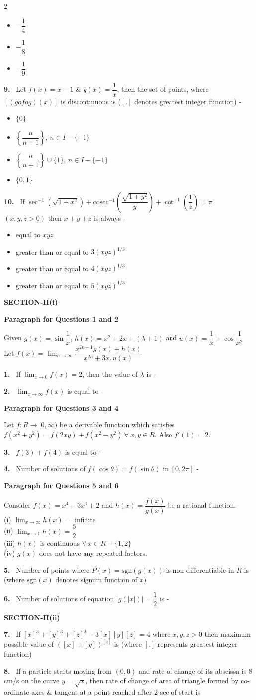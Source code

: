 \documentclass[10pt]{extarticle}
\newcommand{\sect}[1]{\par\smallskip\noindent\textbf{#1}\par}
\newcommand{\qn}[1]{\par\smallskip\noindent\textbf{#1.}~}
\newcommand{\paraq}[2]{\par\smallskip\noindent\textbf{Paragraph for Questions #1 and #2}\par}
\newenvironment{qoptions}{\begin{itemize}[leftmargin=1.8em,itemsep=1pt,topsep=2pt,label={}]}{\end{itemize}}
\newcommand{\opt}[2]{\item[(#1)] #2}
\begin{document}
\begin{multicols}{2}
\begin{qoptions}
\opt{B}{$-\dfrac14$}
\opt{C}{$-\dfrac18$}
\opt{D}{$-\dfrac19$}
\end{qoptions}
\qn{9} Let $f(x)=x-1$ \& $g(x)=\dfrac1x$, then the set of points, where $[(gofog)(x)]$ is discontinuous is ($[.]$ denotes greatest integer function) -
\begin{qoptions}
\opt{A}{$\{0\}$}
\opt{B}{$\left\{\dfrac{n}{n+1}\right\}$, $n\in I-\{-1\}$}
\opt{C}{$\left\{\dfrac{n}{n+1}\right\}\cup\{1\}$, $n\in I-\{-1\}$}
\opt{D}{$\{0,1\}$}
\end{qoptions}
\qn{10} If $\sec^{-1}\left(\sqrt{1+x^2}\right)+\mathrm{cosec}^{-1}\left(\dfrac{\sqrt{1+y^2}}{y}\right)+\cot^{-1}\left(\dfrac1z\right)=\pi$ $(x,y,z>0)$ then $x+y+z$ is always -
\begin{qoptions}
\opt{A}{equal to $xyz$}
\opt{B}{greater than or equal to $3(xyz)^{1/3}$}
\opt{C}{greater than or equal to $4(xyz)^{1/3}$}
\opt{D}{greater than or equal to $5(xyz)^{1/3}$}
\end{qoptions}
\sect{SECTION-II(i)}
\paraq{1}{2}
Given $g(x)=\sin\dfrac1x$, $h(x)=x^2+2x+(\lambda+1)$ and $u(x)=\dfrac1x+\cos\dfrac1{x^2}$\\
Let $f(x)=\displaystyle\lim_{n\to\infty}\dfrac{x^{2n+1}g(x)+h(x)}{x^{2n}+3x.\,u(x)}$
\qn{1} If $\displaystyle\lim_{x\to0}f(x)=2$, then the value of $\lambda$ is -
\qn{2} $\displaystyle\lim_{x\to\infty}f(x)$ is equal to -
\paraq{3}{4}
Let $f:R\to[0,\infty)$ be a derivable function which satisfies $f(x^2+y^2)=f(2xy)+f(x^2-y^2)\ \forall\ x,y\in R$. Also $f'(1)=2$.
\qn{3} $f(3)+f(4)$ is equal to -
\qn{4} Number of solutions of $f(\cos\theta)=f(\sin\theta)$ in $[0,2\pi]$ -
\paraq{5}{6}
Consider $f(x)=x^4-3x^3+2$ and $h(x)=\dfrac{f(x)}{g(x)}$ be a rational function.\\
(i) $\displaystyle\lim_{x\to\infty}h(x)=$ infinite\\
(ii) $\displaystyle\lim_{x\to1}h(x)=\dfrac52$\\
(iii) $h(x)$ is continuous $\forall\ x\in R-\{1,2\}$\\
(iv) $g(x)$ does not have any repeated factors.
\qn{5} Number of points where $P(x)=\mathrm{sgn}(g(x))$ is non differentiable in $R$ is (where $\mathrm{sgn}(x)$ denotes signum function of $x$)
\qn{6} Number of solutions of equation $|g(|x|)|=\dfrac12$ is -
\sect{SECTION-II(ii)}
\qn{7} If $[x]^3+[y]^3+[z]^3-3[x][y][z]=4$ where $x,y,z>0$ then maximum possible value of $([x]+[y])^{[z]}$ is (where $[.]$ represents greatest integer function)
\qn{8} If a particle starts moving from $(0,0)$ and rate of change of its abscissa is 8 cm/s on the curve $y=\sqrt x$, then rate of change of area of triangle formed by co-ordinate axes \& tangent at a point reached after 2 sec of start is

\end{multicols}
\end{document}
